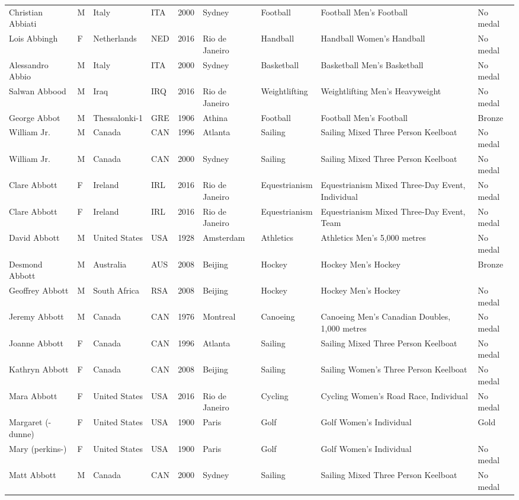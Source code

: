 \documentclass{article}%
\begin{document}
\begin{longtable}{l l l l l l l l l}
Christian Abbiati&M&Italy&ITA&2000&Sydney&Football&Football Men's Football&No medal\\%
Lois Abbingh&F&Netherlands&NED&2016&Rio de Janeiro&Handball&Handball Women's Handball&No medal\\%
Alessandro Abbio&M&Italy&ITA&2000&Sydney&Basketball&Basketball Men's Basketball&No medal\\%
Salwan Abbood&M&Iraq&IRQ&2016&Rio de Janeiro&Weightlifting&Weightlifting Men's Heavyweight&No medal\\%
George Abbot&M&Thessalonki{-}1&GRE&1906&Athina&Football&Football Men's Football&Bronze\\%
William Jr.&M&Canada&CAN&1996&Atlanta&Sailing&Sailing Mixed Three Person Keelboat&No medal\\%
William Jr.&M&Canada&CAN&2000&Sydney&Sailing&Sailing Mixed Three Person Keelboat&No medal\\%
Clare Abbott&F&Ireland&IRL&2016&Rio de Janeiro&Equestrianism&Equestrianism Mixed Three{-}Day Event, Individual&No medal\\%
Clare Abbott&F&Ireland&IRL&2016&Rio de Janeiro&Equestrianism&Equestrianism Mixed Three{-}Day Event, Team&No medal\\%
David Abbott&M&United States&USA&1928&Amsterdam&Athletics&Athletics Men's 5,000 metres&No medal\\%
Desmond Abbott&M&Australia&AUS&2008&Beijing&Hockey&Hockey Men's Hockey&Bronze\\%
Geoffrey Abbott&M&South Africa&RSA&2008&Beijing&Hockey&Hockey Men's Hockey&No medal\\%
Jeremy Abbott&M&Canada&CAN&1976&Montreal&Canoeing&Canoeing Men's Canadian Doubles, 1,000 metres&No medal\\%
Joanne Abbott&F&Canada&CAN&1996&Atlanta&Sailing&Sailing Mixed Three Person Keelboat&No medal\\%
Kathryn Abbott&F&Canada&CAN&2008&Beijing&Sailing&Sailing Women's Three Person Keelboat&No medal\\%
Mara Abbott&F&United States&USA&2016&Rio de Janeiro&Cycling&Cycling Women's Road Race, Individual&No medal\\%
Margaret ({-}dunne)&F&United States&USA&1900&Paris&Golf&Golf Women's Individual&Gold\\%
Mary (perkins{-})&F&United States&USA&1900&Paris&Golf&Golf Women's Individual&No medal\\%
Matt Abbott&M&Canada&CAN&2000&Sydney&Sailing&Sailing Mixed Three Person Keelboat&No medal\\%

\end{longtable}
\end{document}
